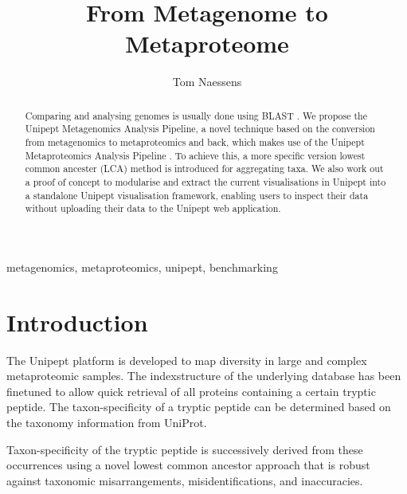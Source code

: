 \documentclass[twocolumn]{phdsymp}
\begin{document}
\title{From Metagenome to Metaproteome}

\author{Tom Naessens}


\maketitle

\begin{abstract}
Comparing and analysing genomes is usually done using BLAST
\cite{altschul1990basic}. We propose the Unipept Metagenomics Analysis Pipeline,
a novel technique based on the conversion from metagenomics to metaproteomics
and back, which makes use of the Unipept Metaproteomics Analysis Pipeline
\cites{mesuere2012unipept, uniprot2014uniprot}. To achieve this, a more specific
version lowest common ancester (LCA) method is introduced for aggregating taxa. 
We also work out a proof of concept to modularise and extract the
current visualisations in Unipept into a standalone Unipept visualisation
framework, enabling users to inspect their data without uploading their data to
the Unipept web application.
\end{abstract}

\begin{keywords}
metagenomics, metaproteomics, unipept, benchmarking
\end{keywords}

\section{Introduction} 

The Unipept platform is developed to map diversity in large and complex
metaproteomic samples. The indexstructure of the underlying database has been
finetuned to allow quick retrieval of all proteins containing a certain tryptic
peptide. The taxon-specificity of a tryptic peptide can be determined based on
the taxonomy information from UniProt\cite{uniprot2014uniprot}. 

Taxon-specificity of the tryptic peptide is successively derived from these
occurrences using a novel lowest common ancestor approach that is robust against
taxonomic misarrangements, misidentifications, and inaccuracies.
\end{document}
